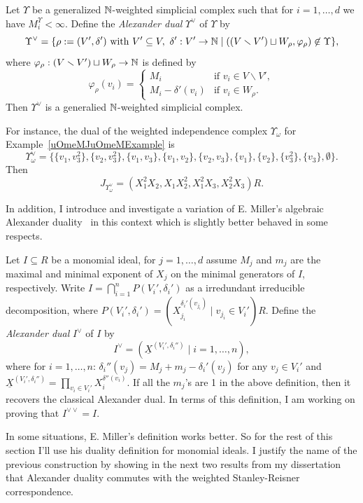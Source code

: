 \documentclass{article}
\begin{document}
    Let $\Upsilon$ be a generalized $\mathbb{N}$-weighted simplicial complex such that for $i = 1,\dots,d$ we have $M_i^\Upsilon < \infty$. Define the \emph{Alexander dual} $\Upsilon^\vee$ of $\Upsilon$ by
    \[\Upsilon^\vee = \{\rho := (V',\delta') \text{ with }V' \subseteq V, \ \delta': V' \to \mathbb{N} \mid ((V \smallsetminus {V'}) \sqcup W_\rho,\varphi_\rho) \not\in \Upsilon\},\]
    where $\varphi_\rho: (V \smallsetminus V') \sqcup W_\rho \to \mathbb{N}$ is defined by
    \[\varphi_\rho(v_i) = 
        \left\{\begin{array}{ll}
                M_i & \text{if }v_i \in V \smallsetminus {V'}, \\
                M_i-\delta'(v_i) & \text{if }v_i \in W_\rho.
        \end{array}\right.
    \]
    Then $\Upsilon^\vee$ is a generalied $\mathbb{N}$-weighted simplicial complex. \par
    For instance, the dual of the weighted independence complex $\Upsilon_\omega$ for Example~\ref{uOmeMJuOmeMExample} is
    \[\Upsilon_\omega^\vee = \{\{v_1,v_3^2\},\{v_2,v_3^2\},\{v_1,v_3\},\{v_1,v_2\},\{v_2,v_3\},\{v_1\},\{v_2\},\{v_3^2\},\{v_3\},\emptyset\}.\]
    Then
    \[J_{\Upsilon_\omega^\vee} = (X_1^2X_2,X_1X_2^2,X_1^2X_3,X_2^2X_3)R.\]
    \par In addition, I introduce and investigate a variation of E. Miller’s algebraic Alexander duality~\cite{miller1998alexander} in this context which is slightly better behaved in some respects. \par
    \par Let $I \subseteq R$ be a monomial ideal, for $j = 1,\dots,d$ assume $M_j$ and $m_j$ are the maximal and minimal exponent of $X_j$ on the minimal generators of $I$, respectively. Write $I = \bigcap_{i=1}^n P(V_i',\delta_i')$ as a irredundant irreducible decomposition, where $P(V_i',\delta_i') = (X_{j_i}^{\delta_i'(v_{j_i})} \mid v_{j_i} \in V_i')R$. Define the \emph{Alexander dual} $I^\vee$ of $I$ by
    \[I^\vee = (\underline X^{(V_i',\delta_i'')} \mid i = 1,\dots,n),\]
    where for $i = 1,\dots,n$: $\delta_i''(v_j) = M_j + m_j - \delta_i'(v_j)$ for any $v_j \in V_i'$ and $\underline X^{(V_i',\delta_i'')} = \prod_{v_i \in V_i'}X_i^{\delta''(v_i)}$. If all the $m_j$'s are 1 in the above definition, then it recovers the classical Alexander dual. In terms of this definition, I am working on proving that $I^{\vee\vee} = I$. \par
    In some situations, E. Miller's definition works better. So for the rest of this section I'll use his duality definition for monomial ideals. I justify the name of the previous construction by showing in the next two results from my dissertation that Alexander duality commutes with the weighted Stanley-Reisner correspondence.
\end{document}

